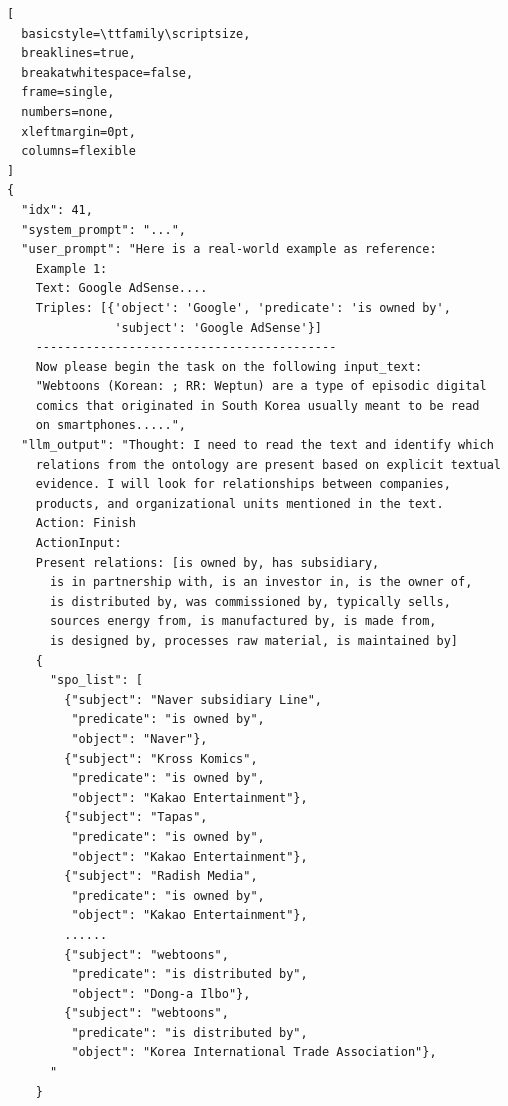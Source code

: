 \begin{appendices}
\begin{lstlisting}[
  basicstyle=\ttfamily\scriptsize,
  breaklines=true,
  breakatwhitespace=false,
  frame=single,
  numbers=none,
  xleftmargin=0pt,
  columns=flexible
]
{
  "idx": 41,
  "system_prompt": "...",
  "user_prompt": "Here is a real-world example as reference:
    Example 1:
    Text: Google AdSense....
    Triples: [{'object': 'Google', 'predicate': 'is owned by',
               'subject': 'Google AdSense'}]
    ------------------------------------------
    Now please begin the task on the following input_text:
    "Webtoons (Korean: ; RR: Weptun) are a type of episodic digital
    comics that originated in South Korea usually meant to be read
    on smartphones.....",
  "llm_output": "Thought: I need to read the text and identify which
    relations from the ontology are present based on explicit textual
    evidence. I will look for relationships between companies,
    products, and organizational units mentioned in the text.
    Action: Finish
    ActionInput:
    Present relations: [is owned by, has subsidiary,
      is in partnership with, is an investor in, is the owner of,
      is distributed by, was commissioned by, typically sells,
      sources energy from, is manufactured by, is made from,
      is designed by, processes raw material, is maintained by]
    {
      "spo_list": [
        {"subject": "Naver subsidiary Line",
         "predicate": "is owned by",
         "object": "Naver"},
        {"subject": "Kross Komics",
         "predicate": "is owned by",
         "object": "Kakao Entertainment"},
        {"subject": "Tapas",
         "predicate": "is owned by",
         "object": "Kakao Entertainment"},
        {"subject": "Radish Media",
         "predicate": "is owned by",
         "object": "Kakao Entertainment"},
        ......
        {"subject": "webtoons",
         "predicate": "is distributed by",
         "object": "Dong-a Ilbo"},
        {"subject": "webtoons",
         "predicate": "is distributed by",
         "object": "Korea International Trade Association"},
      "
    }
\end{lstlisting}

\end{appendices}
